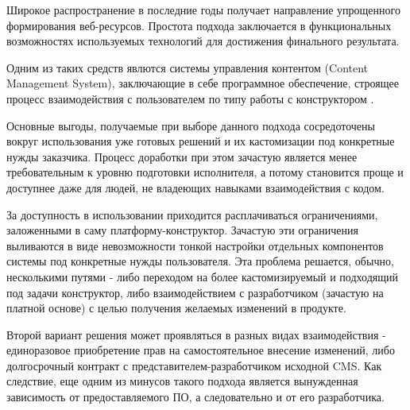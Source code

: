     Широкое распространение в последние годы получает направление упрощенного формирования веб-ресурсов.
    Простота подхода заключается в функциональных возможностях используемых технологий для достижения финального результата.

    Одним из таких средств явлются системы управления контентом (Content Management System), заключающие в себе программное обеспечение, строящее процесс взаимодействия с пользователем по типу работы с конструктором \cite{wiki-CMS}.

    Основные выгоды, получаемые при выборе данного подхода сосредоточены вокруг использования уже готовых решений и их кастомизации под конкретные нужды заказчика.
    Процесс доработки при этом зачастую является менее требовательным к уровню подготовки исполнителя, а потому становится проще и доступнее даже для людей, не владеющих навыками взаимодействия с кодом.
    
    За доступность в использовании приходится расплачиваться ограничениями, заложенными в саму платформу-конструктор.
    Зачастую эти ограничения выливаются в виде невозможности тонкой настройки отдельных компонентов системы под конкретные нужды пользователя.
    Эта проблема решается, обычно, несколькими путями - либо переходом на более кастомизируемый и подходящий под задачи конструктор, либо взаимодействием с разработчиком (зачастую на платной основе) с целью получения желаемых изменений в продукте.

    Второй вариант решения может проявляться в разных видах взаимодействия - единоразовое приобретение прав на самостоятельное внесение изменений, либо долгосрочный контракт с представителем-разработчиком исходной CMS.
    Как следствие, еще одним из минусов такого подхода является вынужденная зависимость от предоставляемого ПО, а следовательно и от его разработчика.

